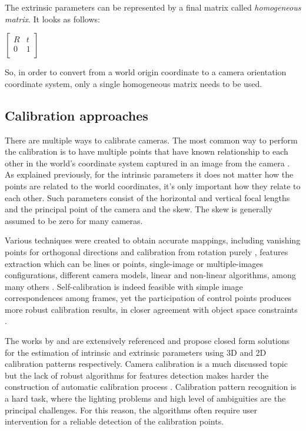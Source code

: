 \documentclass[msc, a4paper, classic, en]{ufbathesis}
\begin{document}
The extrinsic parameters can be represented by a final matrix called \textit{homogeneous matrix}. It looks as follows:

\begin{center}
$\begin{bmatrix}
R & t \\
0 & 1 \\
\end{bmatrix}$
\end{center}

So, in order to convert from a world origin coordinate to a camera orientation coordinate system, only a single homogeneous matrix needs to be used.

\subsection{Calibration approaches}

There are multiple ways to calibrate cameras. The most common way to perform the calibration is to have multiple points that have known relationship to each other in the world's coordinate system captured in an image from the camera \cite{tillapaugh2008indirect}. As explained previously, for the intrinsic parameters it does not matter how the points are related to the world coordinates, it's only important how they relate to each other. Such parameters consist of the horizontal and vertical focal lengths and the principal point of the camera and the skew. The skew is generally assumed to be zero \cite{furht2011handbook} for many cameras.

Various techniques were created to obtain accurate mappings, including vanishing points for orthogonal directions and calibration from rotation purely \cite{Medioni:2004:ETC:993884}, features extraction which can be lines or points, single-image or multiple-images configurations, different camera models, linear and non-linear algorithms, among many others \cite{Armangue00acomparative} \cite{clarke98}. Self-calibration is indeed feasible with simple image correspondences among frames, yet the participation of control points produces more robust calibration results, in closer agreement with object space constraints \cite{Douskos_automaticcalibration}.

The works by \cite{Tsai86} and \cite{zhang2000flexible} are extensively referenced and propose closed form solutions for the estimation of intrinsic and extrinsic parameters using 3D and 2D calibration patterns respectively. Camera calibration is a much discussed topic but the lack of robust algorithms for features detection makes harder the construction of automatic calibration process \cite{gustavo}. Calibration pattern recognition is a hard task, where the lighting problems and high level of ambiguities are the principal challenges. For this reason, the algorithms often require user intervention for a reliable detection of the calibration points.
\end{document}
